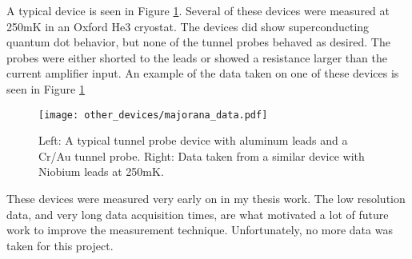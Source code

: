 A typical device is seen in Figure \ref{fig:majorana_data}. Several of these devices were measured at 250mK in an Oxford He3 cryostat. The devices did show superconducting quantum dot behavior, but none of the tunnel probes behaved as desired. The probes were either shorted to the leads or showed a resistance larger than the current amplifier input. An example of the data taken on one of these devices is seen in Figure \ref{fig:majorana_data}

\begin{figure}
    \centering
    \texttt{[image: other\_devices/majorana\_data.pdf]}
    \caption{Left: A typical tunnel probe device with aluminum leads and a Cr/Au tunnel probe. Right: Data taken from a similar device with Niobium leads at 250mK.}
    \label{fig:majorana_data}
\end{figure}

These devices were measured very early on in my thesis work. The low resolution data, and very long data acquisition times, are what motivated a lot of future work to improve the measurement technique. Unfortunately, no more data was taken for this project.